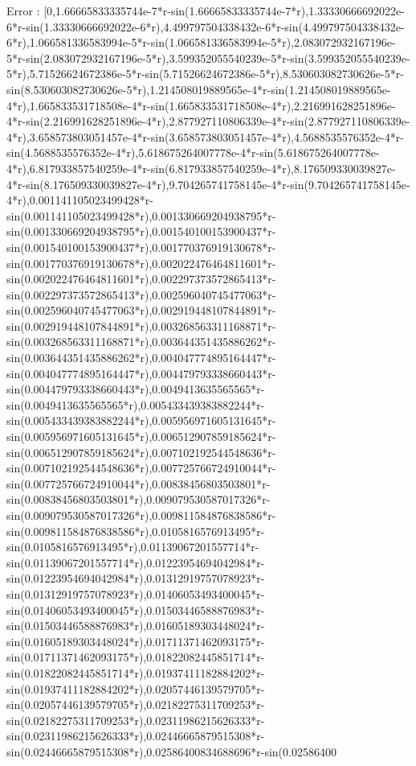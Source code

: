 \documentclass[a4paper,10pt]{article}
\begin{document}
\begin{eulernotebook}
\begin{eulercomment}
\begin{eulercomment}
\begin{eulercomment}
\begin{eulercomment}
\begin{eulercomment}
\begin{eulercomment}
\begin{eulercomment}
\begin{eulercomment}
\begin{eulercomment}
\begin{eulercomment}
\begin{eulercomment}
\begin{eulercomment}
\begin{eulercomment}
\begin{eulercomment}
\begin{eulercomment}
\begin{eulercomment}
\begin{eulercomment}
\begin{eulercomment}
\begin{eulercomment}
\begin{eulercomment}
\begin{eulercomment}
\begin{eulercomment}
\begin{eulercomment}
\begin{eulercomment}
\begin{eulercomment}
\begin{eulercomment}
\begin{eulercomment}
\begin{eulercomment}
\begin{euleroutput}
  Error : [0,1.66665833335744e-7*r-sin(1.66665833335744e-7*r),1.33330666692022e-6*r-sin(1.33330666692022e-6*r),4.499797504338432e-6*r-sin(4.499797504338432e-6*r),1.066581336583994e-5*r-sin(1.066581336583994e-5*r),2.083072932167196e-5*r-sin(2.083072932167196e-5*r),3.599352055540239e-5*r-sin(3.599352055540239e-5*r),5.71526624672386e-5*r-sin(5.71526624672386e-5*r),8.530603082730626e-5*r-sin(8.530603082730626e-5*r),1.214508019889565e-4*r-sin(1.214508019889565e-4*r),1.665833531718508e-4*r-sin(1.665833531718508e-4*r),2.216991628251896e-4*r-sin(2.216991628251896e-4*r),2.877927110806339e-4*r-sin(2.877927110806339e-4*r),3.658573803051457e-4*r-sin(3.658573803051457e-4*r),4.5688535576352e-4*r-sin(4.5688535576352e-4*r),5.618675264007778e-4*r-sin(5.618675264007778e-4*r),6.817933857540259e-4*r-sin(6.817933857540259e-4*r),8.176509330039827e-4*r-sin(8.176509330039827e-4*r),9.704265741758145e-4*r-sin(9.704265741758145e-4*r),0.001141105023499428*r-sin(0.001141105023499428*r),0.001330669204938795*r-sin(0.001330669204938795*r),0.001540100153900437*r-sin(0.001540100153900437*r),0.001770376919130678*r-sin(0.001770376919130678*r),0.002022476464811601*r-sin(0.002022476464811601*r),0.002297373572865413*r-sin(0.002297373572865413*r),0.002596040745477063*r-sin(0.002596040745477063*r),0.002919448107844891*r-sin(0.002919448107844891*r),0.003268563311168871*r-sin(0.003268563311168871*r),0.003644351435886262*r-sin(0.003644351435886262*r),0.004047774895164447*r-sin(0.004047774895164447*r),0.004479793338660443*r-sin(0.004479793338660443*r),0.0049413635565565*r-sin(0.0049413635565565*r),0.005433439383882244*r-sin(0.005433439383882244*r),0.005956971605131645*r-sin(0.005956971605131645*r),0.006512907859185624*r-sin(0.006512907859185624*r),0.007102192544548636*r-sin(0.007102192544548636*r),0.007725766724910044*r-sin(0.007725766724910044*r),0.00838456803503801*r-sin(0.00838456803503801*r),0.009079530587017326*r-sin(0.009079530587017326*r),0.009811584876838586*r-sin(0.009811584876838586*r),0.0105816576913495*r-sin(0.0105816576913495*r),0.01139067201557714*r-sin(0.01139067201557714*r),0.01223954694042984*r-sin(0.01223954694042984*r),0.01312919757078923*r-sin(0.01312919757078923*r),0.01406053493400045*r-sin(0.01406053493400045*r),0.01503446588876983*r-sin(0.01503446588876983*r),0.01605189303448024*r-sin(0.01605189303448024*r),0.01711371462093175*r-sin(0.01711371462093175*r),0.01822082445851714*r-sin(0.01822082445851714*r),0.01937411182884202*r-sin(0.01937411182884202*r),0.02057446139579705*r-sin(0.02057446139579705*r),0.02182275311709253*r-sin(0.02182275311709253*r),0.02311986215626333*r-sin(0.02311986215626333*r),0.02446665879515308*r-sin(0.02446665879515308*r),0.02586400834688696*r-sin(0.02586400
\end{euleroutput}
\end{eulercomment}
\end{eulercomment}
\end{eulercomment}
\end{eulercomment}
\end{eulercomment}
\end{eulercomment}
\end{eulercomment}
\end{eulercomment}
\end{eulercomment}
\end{eulercomment}
\end{eulercomment}
\end{eulercomment}
\end{eulercomment}
\end{eulercomment}
\end{eulercomment}
\end{eulercomment}
\end{eulercomment}
\end{eulercomment}
\end{eulercomment}
\end{eulercomment}
\end{eulercomment}
\end{eulercomment}
\end{eulercomment}
\end{eulercomment}
\end{eulercomment}
\end{eulercomment}
\end{eulercomment}
\end{eulercomment}
\end{eulernotebook}
\end{document}
